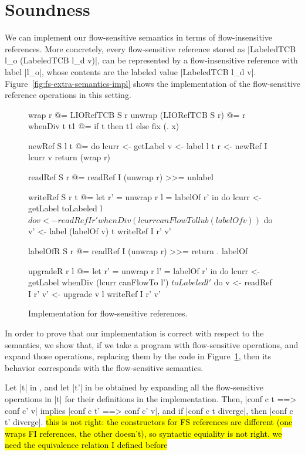 \section{Soundness}
\label{sec:soundness}

We can implement our flow-sensitive semantics in terms of
flow-insensitive references. More concretely, every flow-sensitive
reference stored as |LabeledTCB l_o (LabeledTCB l_d v)|, can be
represented by a flow-insensitive reference with label |l_o|, whose
contents are the labeled value |LabeledTCB l_d
v|. Figure~\ref{fig:fs-extra-semantics-impl} shows the implementation
of the flow-sensitive reference operations in this setting.

\begin{figure}
\small
\begin{code}
wrap r @= LIORefTCB S r
unwrap (LIORefTCB S r) @= r
whenDiv t t1 @= if t then t1 else fix (\x. x)

newRef S l t @= do
  lcurr  <- getLabel
  v      <- label l t
  r      <- newRef I lcurr v
  return (wrap r)


readRef S r @= readRef I (unwrap r) >>= unlabel


writeRef S r t @= let  r'  = unwrap r
                       l   = labelOf r' in do
  lcurr <- getLabel
  toLabeled l $ do
     v   <- readRef I r'
     whenDiv (lcurr canFlowTo l lub (labelOf v)) $ do
       v'  <- label (labelOf v) t
       writeRef I r' v'


labelOfR S r @= readRef I (unwrap r) >>= return . labelOf

upgradeR r l @= let  r'  = unwrap r
                     l'  = labelOf r' in do
  lcurr <- getLabel
  whenDiv (lcurr canFlowTo l') $ toLabeled l' $ do
     v   <- readRef I r'
     v'  <- upgrade v l
     writeRef I r' v'

\end{code}
\caption{Implementation for flow-sensitive references.\label{fig:fs-exts-semantics-impl}}
\end{figure}

In order to prove that our implementation is correct with respect to
the semantics, we show that, if we take a program with flow-sensitive
operations, and expand those operations, replacing them by the code in
Figure~\ref{fig:fs-exts-semantics-impl}, then its behavior corresponds
with the flow-sensitive semantics.

\begin{theorem}\label{thm:eq} Let |t| in \liofs{}, and let |t'| in \lio{} be
  obtained by expanding all the flow-sensitive operations in |t| for
  their definitions in the implementation. Then, |conf c t ==> conf
  c' v| implies |conf c t' ==> conf c' v|, and if |conf c t diverge|,
  then |conf c t' diverge|.
  \textrm{\hl{this is not right: the constructors for FS references are
  different (one wraps FI references, the other doesn't), so syntactic
  equiality is not right.  we need the equivalence relation I defined before}}
\end{theorem}

